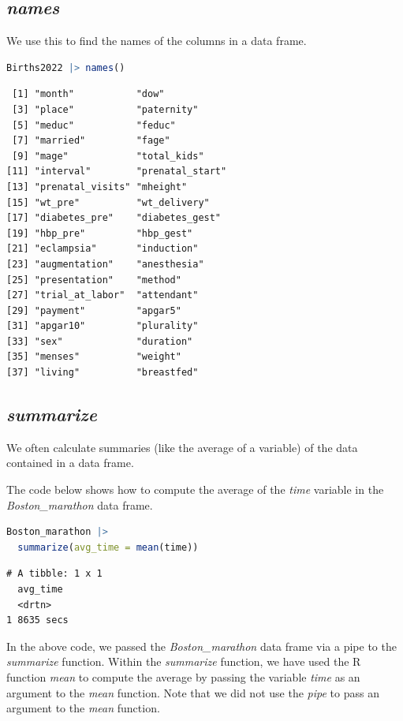 \documentclass[
  12pt,
  letterpaper,
  DIV=11,
  numbers=noendperiod]{scrreprt}
\begin{document}
\subsection{\texorpdfstring{\emph{names}}{names}}\label{names}

We use this to find the names of the columns in a data frame.

\begin{lstlisting}[language=R]
Births2022 |> names()
\end{lstlisting}

\begin{lstlisting}
 [1] "month"           "dow"            
 [3] "place"           "paternity"      
 [5] "meduc"           "feduc"          
 [7] "married"         "fage"           
 [9] "mage"            "total_kids"     
[11] "interval"        "prenatal_start" 
[13] "prenatal_visits" "mheight"        
[15] "wt_pre"          "wt_delivery"    
[17] "diabetes_pre"    "diabetes_gest"  
[19] "hbp_pre"         "hbp_gest"       
[21] "eclampsia"       "induction"      
[23] "augmentation"    "anesthesia"     
[25] "presentation"    "method"         
[27] "trial_at_labor"  "attendant"      
[29] "payment"         "apgar5"         
[31] "apgar10"         "plurality"      
[33] "sex"             "duration"       
[35] "menses"          "weight"         
[37] "living"          "breastfed"      
\end{lstlisting}

\subsection{\texorpdfstring{\emph{summarize}}{summarize}}\label{sec-summarize-function}

We often calculate summaries (like the average of a variable) of the
data contained in a data frame.

The code below shows how to compute the average of the \emph{time}
variable in the \emph{Boston\_marathon} data frame.

\begin{lstlisting}[language=R]
Boston_marathon |> 
  summarize(avg_time = mean(time))
\end{lstlisting}

\begin{lstlisting}
# A tibble: 1 x 1
  avg_time 
  <drtn>   
1 8635 secs
\end{lstlisting}

In the above code, we passed the \emph{Boston\_marathon} data frame via
a pipe to the \emph{summarize} function. Within the \emph{summarize}
function, we have used the R function \emph{mean} to compute the average
by passing the variable \emph{time} as an argument to the \emph{mean}
function. Note that we did not use the \emph{pipe} to pass an argument
to the \emph{mean} function.
\end{document}
